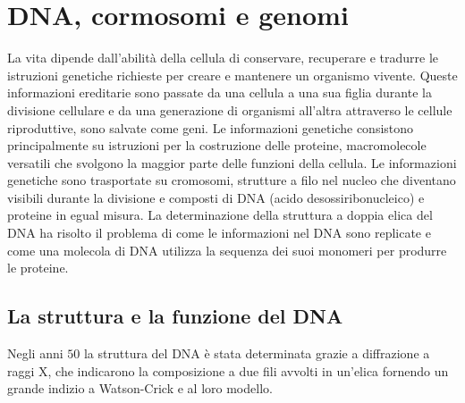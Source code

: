 \chapter{DNA, cormosomi e genomi}
La vita dipende dall'abilit\`a della cellula di conservare, recuperare e tradurre le istruzioni genetiche richieste per creare e mantenere un organismo vivente. Queste informazioni
ereditarie sono passate da una cellula a una sua figlia durante la divisione cellulare e da una generazione di organismi all'altra attraverso le cellule riproduttive, sono salvate come
geni. Le informazioni genetiche consistono principalmente su istruzioni per la costruzione delle proteine, macromolecole versatili che svolgono la maggior parte delle funzioni della 
cellula. Le informazioni genetiche sono trasportate su cromosomi, strutture a filo nel nucleo che diventano visibili durante la divisione e composti di DNA (acido desossiribonucleico) e 
proteine in egual misura. La determinazione della struttura a doppia elica del DNA ha risolto il problema di come le informazioni nel DNA sono replicate e come una molecola di DNA 
utilizza la sequenza dei suoi monomeri per produrre le proteine. 
\section{La struttura e la funzione del DNA}
Negli anni $50$ la struttura del DNA \`e stata determinata grazie a diffrazione a raggi X, che indicarono la composizione a due fili avvolti in un'elica fornendo un grande indizio a
Watson-Crick e al loro modello.
